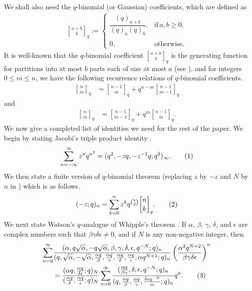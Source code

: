 \documentclass[12pt]{amsart}
\theoremstyle{definition}
\theoremstyle{remark}
\numberwithin{equation}{section}
\newcommand\numberthis{\addtocounter{equation}{1}\tag{\theequation}}
\begin{document}
We shall also need the $q$-binomial (or Gaussian) coefficients, which are defined as
\begin{align*}
{a+b\brack b}_q    
:= \begin{cases}
\dfrac{(q)_{a+b}}{(q)_a(q)_b},&\text{if}\, a,b\ge 0,\\\mbox{}\\
0,&\text{otherwise}.\end{cases}    
\end{align*}
It is well-known that the $q$-binomial coefficient ${a+b\brack b}_q$ is the generating function for partitions into at most $b$ parts each of size at most $a$ (see \cite[Chapter $3$]{A}), and for integers $0\le m\le n$, we have the following recurrence relations of $q$-binomial coefficients.
\begin{align*}
{n\brack m}_q &= {n-1\brack m}_q + q^{n-m}{n-1\brack m-1}_q
\end{align*}
and
\begin{align*}
{n\brack m}_q &= {n-1\brack m-1}_q + q^m{n-1\brack m}_q.
\end{align*}
We now give a completed list of identities we need for the rest of the paper. We begin by stating Jacobi's triple product identity \cite[p. $21$, $(2.2.10)$]{A}.
\begin{align*}
\sum\limits_{n=-\infty}^{\infty}z^nq^{n^2} = (q^2,-zq,-z^{-1}q;q^2)_{\infty}.\numberthis\label{eq21}
\end{align*}
We then state a finite version of $q$-binomial theorem (replacing $z$ by $-z$ and $N$ by $n$ in \cite[p. $36$, $(3.3.6)$]{A}) which is as follows.
\begin{align*}
(-z;q)_{n}=\sum_{k=0}^{n}z^{k}q^{\binom{k}{2}}{n\brack k}_{q}.\numberthis\label{eq22}
\end{align*}
We next state Watson's $q$-analogue of Whipple's theorem \cite[p. $81$, $(4.1.3)$]{AndrewsBerndt2009}. If $\alpha$, $\beta$, $\gamma$, $\delta$, and $\epsilon$ are complex numbers such that $\beta\gamma\delta\epsilon\neq 0$, and if $N$ is any non-negative integer, then
\begin{align*}
\sum\limits_{n=0}^{\infty}&\dfrac{(\alpha,q\sqrt{\alpha},-q\sqrt{\alpha},\beta,\gamma,\delta,\epsilon,q^{-N};q)_n}{(q,\sqrt{\alpha},-\sqrt{\alpha},\frac{\alpha q}{\beta},\frac{\alpha q}{\gamma},\frac{\alpha q}{\delta},\frac{\alpha q}{\epsilon},\alpha q^{N+1};q)_n}\left(\frac{\alpha^2q^{N+2}}{\beta\gamma\delta\epsilon}\right)^n\\
&= \dfrac{(\alpha q,\frac{\alpha q}{\delta\epsilon};q)_N}{(\frac{\alpha q}{\delta},\frac{\alpha q}{\epsilon};q)_N}\sum\limits_{n=0}^{\infty}\dfrac{(\frac{\alpha q}{\beta\gamma},\delta,\epsilon,q^{-N};q)_n}{(q,\frac{\alpha q}{\beta},\frac{\alpha q}{\gamma},\frac{\delta\epsilon q^{-N}}{\alpha};q)_n}q^n.\numberthis\label{eq23}
\end{align*}
\end{document}

